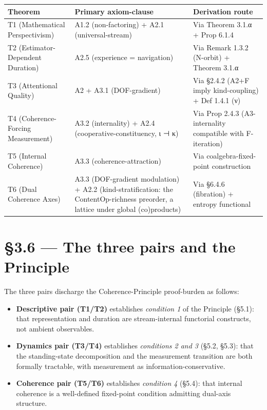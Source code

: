 \documentclass[11pt, openany]{book}
\newcommand{\sectionbreak}{\clearpage}
\begin{document}
\begingroup\setlength{\tabcolsep}{3pt}\renewcommand{\arraystretch}{1.15}\footnotesize
\begin{center}
\begin{tabular}{p{0.66in} p{2.52in} p{1.15in}}
\toprule
Theorem & Primary axiom-clause & Derivation route \\
\midrule
T1 (Mathematical Perspectivism) & A1.2 (non-factoring) + A2.1 (universal-stream) & Via Theorem 3.1.α + Prop 6.1.4 \\
T2 (Estimator-Dependent Duration) & A2.5 (experience = navigation) & Via Remark 1.3.2 (N-orbit) + Theorem 3.1.α \\
T3 (Attentional Quality) & A2 + A3.1 (DOF-gradient) & Via §2.4.2 (A2+F imply kind-coupling) + Def 1.4.1 (ν) \\
T4 (Coherence-Forcing Measurement) & A3.2 (internality) + A2.4 (cooperative-constituency, ι ⊣ κ) & Via Prop 2.4.3 (A3-internality compatible with F-iteration) \\
T5 (Internal Coherence) & A3.3 (coherence-attraction) & Via coalgebra-fixed-point construction \\
T6 (Dual Coherence Axes) & A3.3 (DOF-gradient modulation) + A2.2 (kind-stratification: the ContentOp-richness preorder, a lattice under global (co)products) & Via §6.4.6 (fibration) + entropy functional \\
\bottomrule
\end{tabular}
\end{center}
\endgroup
\sectionbreak

\section{§3.6 --- The three pairs and the Principle}

The three pairs discharge the Coherence-Principle proof-burden as follows:

\begin{itemize}
\item \textbf{Descriptive pair (T1/T2)} establishes \textit{condition 1} of the Principle (§5.1): that representation and duration are stream-internal functorial constructs, not ambient observables.
\item \textbf{Dynamics pair (T3/T4)} establishes \textit{conditions 2 and 3} (§5.2, §5.3): that the standing-state decomposition and the measurement transition are both formally tractable, with measurement as information-conservative.
\item \textbf{Coherence pair (T5/T6)} establishes \textit{condition 4} (§5.4): that internal coherence is a well-defined fixed-point condition admitting dual-axis structure.
\end{itemize}
\end{document}
